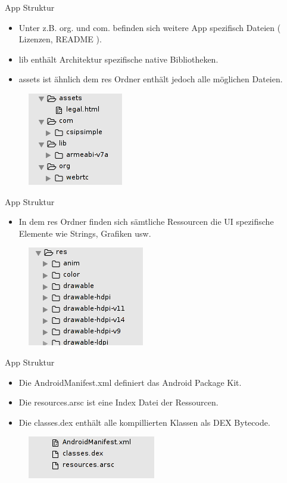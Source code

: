 \documentclass{beamer}
\begin{document}
\begin{frame}{App Struktur}
\begin{itemize}
\item Unter z.B. org. und com. befinden sich weitere App spezifisch Dateien ( Lizenzen, README ).
\item lib enthält Architektur spezifische native Bibliotheken.
\item assets ist ähnlich dem res Ordner enthält jedoch alle möglichen Dateien.
\end{itemize}
\begin{figure}[hb]
 \centering
 \includegraphics[scale=0.6]{app-contents-3}
\end{figure}
\end{frame}

\begin{frame}{App Struktur}
\begin{itemize}
\item In dem res Ordner finden sich sämtliche Ressourcen die UI spezifische Elemente wie
Strings, Grafiken usw. 
\end{itemize}
\begin{figure}[hb]
 \centering
 \includegraphics[scale=0.6]{app-contents-2}
\end{figure}
\end{frame}

\begin{frame}{App Struktur}
\begin{itemize}
\item Die AndroidManifest.xml definiert das Android Package Kit.
\item Die resources.arsc ist eine Index Datei der Ressourcen.
\item Die classes.dex enthält alle kompillierten Klassen als DEX Bytecode.
\end{itemize}
\begin{figure}[hb]
 \centering
 \includegraphics[scale=0.6]{app-contents-4}
\end{figure}
\end{frame}
\end{document}
